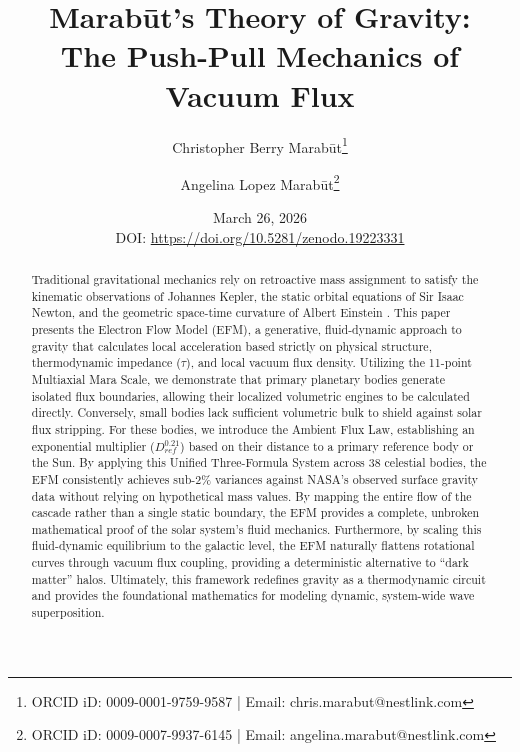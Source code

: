 \documentclass[11pt, a4paper]{article}
\title{\textbf{Marab\={u}t's Theory of Gravity: \\ The Push-Pull Mechanics of Vacuum Flux}}
\author[1]{Christopher Berry Marab\={u}t\thanks{ORCID iD: 0009-0001-9759-9587 | Email: chris.marabut@nestlink.com}}
\author[1]{Angelina Lopez Marab\={u}t\thanks{ORCID iD: 0009-0007-9937-6145 | Email: angelina.marabut@nestlink.com}}
\affil[1]{Independent Researchers}
\date{March 26, 2026 \\ \small{DOI: \url{https://doi.org/10.5281/zenodo.19223331}}}
\begin{document}

\maketitle

\begin{abstract}
  Traditional gravitational mechanics rely on retroactive mass assignment to satisfy the kinematic observations of Johannes Kepler, the static orbital equations of Sir Isaac Newton, and the geometric space-time curvature of Albert Einstein \cite{kepler1609, newton1687, einstein1915}. This paper presents the Electron Flow Model (EFM), a generative, fluid-dynamic approach to gravity that calculates local acceleration based strictly on physical structure, thermodynamic impedance ($\tau$), and local vacuum flux density. Utilizing the 11-point Multiaxial Mara Scale, we demonstrate that primary planetary bodies generate isolated flux boundaries, allowing their localized volumetric engines to be calculated directly. Conversely, small bodies lack sufficient volumetric bulk to shield against solar flux stripping. For these bodies, we introduce the Ambient Flux Law, establishing an exponential multiplier ($D_{ref}^{0.21}$) based on their distance to a primary reference body or the Sun. By applying this Unified Three-Formula System across 38 celestial bodies, the EFM consistently achieves sub-2\% variances against NASA's observed surface gravity data \cite{nasa2024} without relying on hypothetical mass values. By mapping the entire flow of the cascade rather than a single static boundary, the EFM provides a complete, unbroken mathematical proof of the solar system's fluid mechanics. Furthermore, by scaling this fluid-dynamic equilibrium to the galactic level, the EFM naturally flattens rotational curves through vacuum flux coupling, providing a deterministic alternative to ``dark matter'' halos. Ultimately, this framework redefines gravity as a thermodynamic circuit and provides the foundational mathematics for modeling dynamic, system-wide wave superposition.
\end{abstract}
\end{document}
